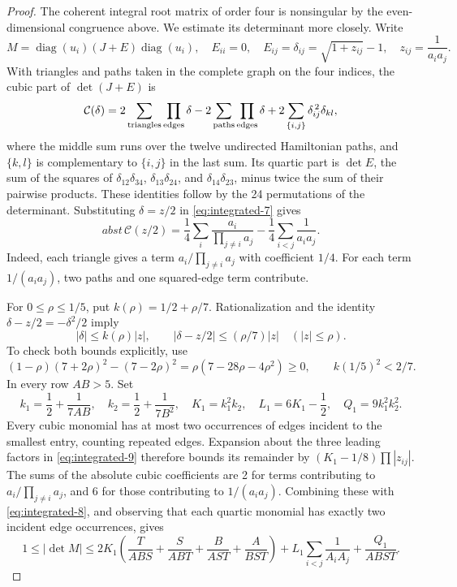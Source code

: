 \documentclass[12pt]{article}
\numberwithin{equation}{section}
\begin{document}
\begin{proof}
The coherent integral root matrix of order four is nonsingular by the
even-dimensional congruence above. We estimate its determinant more
closely. Write
\[
 M=\operatorname{diag}(u_i)(J+E)\operatorname{diag}(u_i),\quad
 E_{ii}=0,\quad E_{ij}=\delta_{ij}
 =\sqrt{1+z_{ij}}-1,\quad z_{ij}=\frac1{a_i a_j}.
\]
With triangles and paths taken in the complete graph on the four indices,
the cubic part of \(\det(J+E)\) is
\begin{equation}\label{eq:integrated-7}
\mathcal C(\delta)=
 2\sum_{\rm triangles}\prod_{\rm edges}\delta
 -2\sum_{\rm paths}\prod_{\rm edges}\delta
 +2\sum_{\{i,j\}}\delta_{ij}^{\,2}\delta_{kl},
\end{equation}
where the middle sum runs over the twelve undirected Hamiltonian paths,
and \(\{k,l\}\) is complementary to \(\{i,j\}\) in the last sum.
Its quartic part is \(\det E\), the sum of the squares of
\(\delta_{12}\delta_{34}\), \(\delta_{13}\delta_{24}\), and
\(\delta_{14}\delta_{23}\), minus twice the sum of their pairwise products. These identities follow by the 24 permutations of the determinant.
Substituting \(\delta=z/2\) in \eqref{eq:integrated-7} gives
\begin{equation}\label{eq:integrated-8}
abst\,\mathcal C(z/2)
 =\frac14\sum_i\frac{a_i}{\prod_{j\ne i}a_j}
                  -\frac14\sum_{i<j}\frac1{a_i a_j}.
\end{equation}
Indeed, each triangle gives a term \(a_i/\prod_{j\ne i}a_j\)
with coefficient \(1/4\). For each term \(1/(a_i a_j)\), two paths
and one squared-edge term contribute.

For \(0\le\rho\le1/5\), put \(k(\rho)=1/2+\rho/7\).
Rationalization and the identity
\(\delta-z/2=-\delta^2/2\) imply
\begin{equation}\label{eq:integrated-9}
|\delta|\le k(\rho)|z|,\qquad
 |\delta-z/2|\le(\rho/7)|z| \quad (|z|\le\rho).
\end{equation}
To check both bounds explicitly, use
\[
 (1-\rho)(7+2\rho)^2-(7-2\rho)^2
   =\rho(7-28\rho-4\rho^2)\ge0,\qquad
 k(1/5)^2<2/7.
\]
In every row \(AB>5\). Set
\[
 k_1=\frac12+\frac1{7AB},\quad k_2=\frac12+\frac1{7B^2},
 \quad K_1=k_1^2k_2,\quad L_1=6K_1-\frac12,\quad
 Q_1=9k_1^2k_2^2.
\]
Every cubic monomial has at most two occurrences of edges incident to
the smallest entry, counting repeated edges. Expansion about the three
leading factors in \eqref{eq:integrated-9} therefore bounds its remainder by
\((K_1-1/8)\prod|z_{ij}|\).
The sums of the absolute cubic coefficients are 2 for terms contributing
to \(a_i/\prod_{j\ne i}a_j\), and 6 for those contributing to
\(1/(a_i a_j)\). Combining these with \eqref{eq:integrated-8}, and observing
that each quartic monomial has exactly two incident edge occurrences,
gives
\begin{equation}\label{eq:integrated-10}
1\le|\det M|\le
 2K_1\left(\frac{T}{ABS}+\frac{S}{ABT}
                    +\frac{B}{AST}+\frac{A}{BST}\right)
 +L_1\sum_{i<j}\frac1{A_iA_j}+\frac{Q_1}{ABST}.
\end{equation}


\end{proof}
\end{document}
